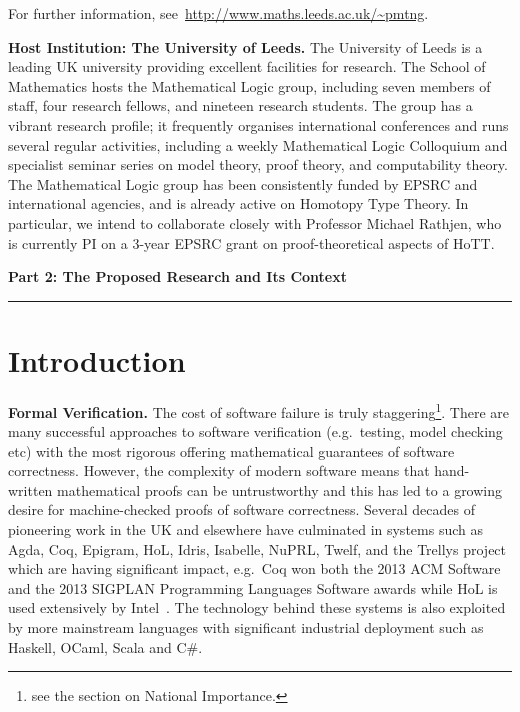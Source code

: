\documentclass[a4paper,11pt]{article}
\newcommand{\eg}{{e.g.}\ }
\begin{document}
For further information,  see~\url{http://www.maths.leeds.ac.uk/~pmtng}.

\textbf{Host Institution: The University of Leeds.} The University of
Leeds is a leading UK university providing
excellent facilities for research. The School of Mathematics hosts the
Mathematical Logic group, including seven members of staff, four
research fellows, and nineteen research students. The group has a
vibrant research profile; it frequently organises
international conferences and runs several regular activities,
including a weekly Mathematical Logic Colloquium and specialist
seminar series on model theory, proof theory, and computability
theory. The Mathematical Logic group has been consistently funded by
EPSRC and international agencies, and is already active on Homotopy
Type Theory. In particular, we intend to collaborate closely with
Professor Michael Rathjen, who is currently PI
on a 3-year EPSRC grant on proof-theoretical aspects of HoTT. 


\newpage
\noindent
{\bf \Large Part 2: The Proposed Research and Its Context}

\vspace*{-0.23in}

\begin{center}
\rule{170mm}{.5mm}
\end{center}

\vspace*{-0.4in}

\section{Introduction}\label{sec:intro}

\vspace*{-0.1in}

{\bf Formal Verification.} The cost of software failure is truly
staggering\footnote{see the section on National Importance.}. There
are many successful approaches to software verification (\eg testing,
model checking etc) with the most rigorous offering mathematical
guarantees of software correctness. However, the complexity of modern
software means that hand-written mathematical proofs can be
untrustworthy and this has led to a growing desire for
machine-checked proofs of software correctness. Several decades of
pioneering work in the UK and elsewhere have culminated in systems
such as Agda, Coq, Epigram, HoL, Idris, Isabelle, NuPRL, Twelf, and the Trellys
project which are having significant impact, \eg Coq won both the 2013
ACM Software and the 2013 SIGPLAN Programming Languages Software
awards while HoL is used extensively by Intel~\cite{}. The technology
behind these
systems is also exploited by 
more mainstream languages with
significant industrial deployment such as Haskell, OCaml, Scala and C\#.
\end{document}

